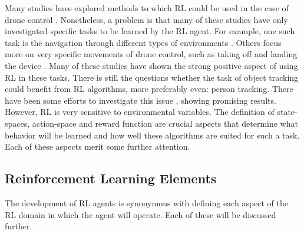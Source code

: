 Many studies 
have explored methods to which RL could be used in the case of drone control \cite{DroneRLUsingTransferLearning, 
iowamasterthesis,AirSimDroneNavigation, DeepRLforNavUsingSensor}. Nonetheless, 
a problem is that many of these studies have only investigated 
specific tasks to be learned by the RL agent. For example, one such task is the navigation  
through different types of environments \cite{DroneRLUsingTransferLearning, AirSimDroneNavigation, 
DeepRLforNavUsingSensor, ObstacleAvoidance}. Others focus more on very specific movements of 
drone control, such as taking off and landing the device \cite{TakeOffFlyForwardusingRL}. 
Many of these studies have shown the strong positive aspect of using RL in these tasks. 
There is still the questions whether the task of object tracking could benefit from 
RL algorithms, more preferably even: person tracking. There have been some efforts 
to investigate this issue \cite{RLenLSTMfordrone, DroneschasingDrones}, showing promising 
results.
However, RL is very sensitive to environmental variables. The definition of state-spaces, 
action-space and reward function are crucial aspects that determine what behavior will 
be learned and how well these algorithms are suited for such a task. 
Each of these aspects merit some further attention.

\subsection{Reinforcement Learning Elements}
The development of RL agents is synonymous with defining each aspect of the RL domain 
in which the agent will operate. Each of these will be discussed further. 


